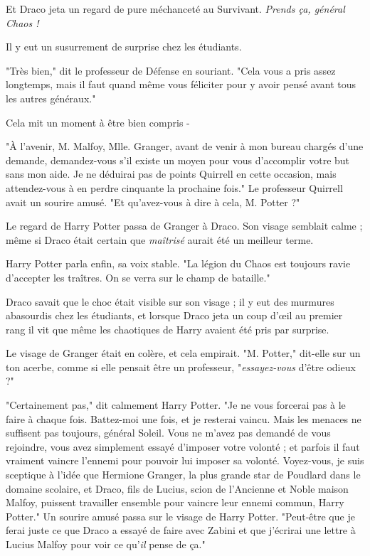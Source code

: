 Et Draco jeta un regard de pure méchanceté au Survivant. \emph{Prends ça, général Chaos !} 

Il y eut un susurrement de surprise chez les étudiants.

"Très bien," dit le professeur de Défense en souriant. "Cela vous a pris assez longtemps, mais il faut quand même vous féliciter pour y avoir pensé avant tous les autres généraux."

Cela mit un moment à être bien compris -

"À l'avenir, M. Malfoy, Mlle. Granger, avant de venir à mon bureau chargés d'une demande, demandez-vous s'il existe un moyen pour vous d'accomplir votre but sans mon aide. Je ne déduirai pas de points Quirrell en cette occasion, mais attendez-vous à en perdre cinquante la prochaine fois." Le professeur Quirrell avait un sourire amusé. "Et qu'avez-vous à dire à cela, M. Potter ?"

Le regard de Harry Potter passa de Granger à Draco. Son visage semblait calme ; même si Draco était certain que \emph{maîtrisé}  aurait été un meilleur terme.

Harry Potter parla enfin, sa voix stable. "La légion du Chaos est toujours ravie d'accepter les traîtres. On se verra sur le champ de bataille."

Draco savait que le choc était visible sur son visage ; il y eut des murmures abasourdis chez les étudiants, et lorsque Draco jeta un coup d'œil au premier rang il vit que même les chaotiques de Harry avaient été pris par surprise.

Le visage de Granger était en colère, et cela empirait. "M. Potter," dit-elle sur un ton acerbe, comme si elle pensait être un professeur, "\emph{essayez-vous}  d'être odieux ?"

"Certainement pas," dit calmement Harry Potter. "Je ne vous forcerai pas à le faire à chaque fois. Battez-moi une fois, et je resterai vaincu. Mais les menaces ne suffisent pas toujours, général Soleil. Vous ne m'avez pas demandé de vous rejoindre, vous avez simplement essayé d'imposer votre volonté ; et parfois il faut vraiment vaincre l'ennemi pour pouvoir lui imposer sa volonté. Voyez-vous, je suis sceptique à l'idée que Hermione Granger, la plus grande star de Poudlard dans le domaine scolaire, et Draco, fils de Lucius, scion de l'Ancienne et Noble maison Malfoy, puissent travailler ensemble pour vaincre leur ennemi commun, Harry Potter." Un sourire amusé passa sur le visage de Harry Potter. "Peut-être que je ferai juste ce que Draco a essayé de faire avec Zabini et que j'écrirai une lettre à Lucius Malfoy pour voir ce qu'\emph{il}  pense de ça."

